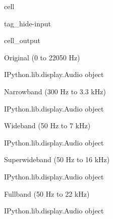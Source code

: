 \documentclass[letterpaper,10pt,english]{jupyterBook}
\begin{document}
\begin{sphinxuseclass}{cell}
\begin{sphinxuseclass}{tag_hide-input}\begin{sphinxVerbatimOutput}

\begin{sphinxuseclass}{cell_output}
\begin{sphinxVerbatim}[commandchars=\\\{\}]
Original (0 to 22050 Hz)
\end{sphinxVerbatim}

\begin{sphinxVerbatim}[commandchars=\\\{\}]
\PYGZlt{}IPython.lib.display.Audio object\PYGZgt{}
\end{sphinxVerbatim}

\begin{sphinxVerbatim}[commandchars=\\\{\}]
Narrowband (300 Hz to 3.3 kHz)
\end{sphinxVerbatim}

\begin{sphinxVerbatim}[commandchars=\\\{\}]
\PYGZlt{}IPython.lib.display.Audio object\PYGZgt{}
\end{sphinxVerbatim}

\begin{sphinxVerbatim}[commandchars=\\\{\}]
Wideband (50 Hz to 7 kHz)
\end{sphinxVerbatim}

\begin{sphinxVerbatim}[commandchars=\\\{\}]
\PYGZlt{}IPython.lib.display.Audio object\PYGZgt{}
\end{sphinxVerbatim}

\begin{sphinxVerbatim}[commandchars=\\\{\}]
Superwideband (50 Hz to 16 kHz)
\end{sphinxVerbatim}

\begin{sphinxVerbatim}[commandchars=\\\{\}]
\PYGZlt{}IPython.lib.display.Audio object\PYGZgt{}
\end{sphinxVerbatim}

\begin{sphinxVerbatim}[commandchars=\\\{\}]
Fullband (50 Hz to 22 kHz)
\end{sphinxVerbatim}

\begin{sphinxVerbatim}[commandchars=\\\{\}]
\PYGZlt{}IPython.lib.display.Audio object\PYGZgt{}
\end{sphinxVerbatim}

\end{sphinxuseclass}\end{sphinxVerbatimOutput}

\end{sphinxuseclass}
\end{sphinxuseclass}
\end{document}
